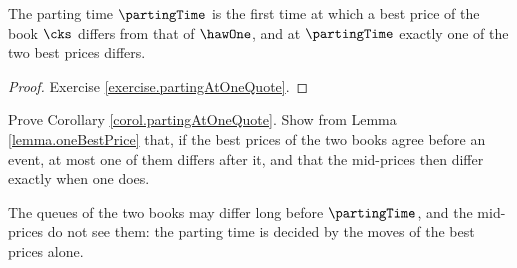 \begin{corol}\label{corol.partingAtOneQuote}
 The parting time $\partingTime$ is the first time
 at which a best price of the book $\cks$ differs from that of $\hawOne$,
 and at $\partingTime$ exactly one of the two best prices differs.
\end{corol}
\begin{proof}
 Exercise \ref{exercise.partingAtOneQuote}.
\end{proof}

\begin{exercise}\label{exercise.partingAtOneQuote}
 Prove Corollary \ref{corol.partingAtOneQuote}.
 Show from Lemma \ref{lemma.oneBestPrice} that,
 if the best prices of the two books agree before an event,
 at most one of them differs after it,
 and that the mid-prices then differ exactly when one does.
\end{exercise}

The queues of the two books may differ long before $\partingTime$,
and the mid-prices do not see them:
the parting time is decided by the moves of the best prices alone.

